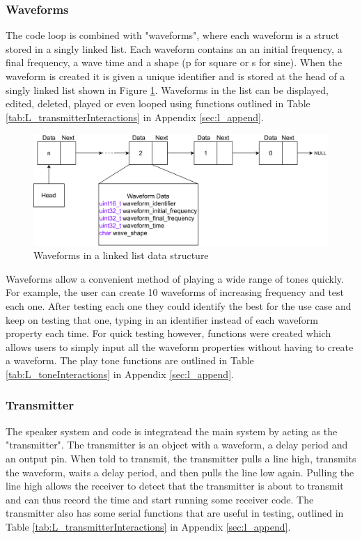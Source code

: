 \subsubsection{Waveforms}
The code loop is combined with "waveforms", where each waveform is a struct stored in a singly linked list. Each waveform contains an an initial frequency, a final frequency, a wave time and a shape (p for square or s for sine). When the waveform is created it is given a unique identifier and is stored at the head of a singly linked list shown in Figure \ref{fig:L_Waveforms}. Waveforms in the list can be displayed, edited, deleted, played or even looped using functions outlined in Table \ref{tab:L_transmitterInteractions} in Appendix \ref{sec:l_append}. \\

\begin{figure} [!htb]
	\hfill\includegraphics[width=\textwidth]{./images/speaker/L_Waveforms}\hspace{\fill}
	\caption{Waveforms in a linked list data structure}
	\label{fig:L_Waveforms}
\end{figure} 

Waveforms allow a convenient method of playing a wide range of tones quickly. For example, the user can create 10 waveforms of increasing frequency and test each one. After testing each one they could identify the best for the use case and keep on testing that one, typing in an identifier instead of each waveform property each time. For quick testing however, functions were created which allows users to simply input all the waveform properties without having to create a waveform. The play tone functions are outlined in Table \ref{tab:L_toneInteractions} in Appendix \ref{sec:l_append}. \\

\subsubsection{Transmitter}
The speaker system and code is integratead the main system by acting as the "transmitter". The transmitter is an object with a waveform, a delay period and an output pin. When told to transmit, the transmitter pulls a line high, transmits the waveform, waits a delay period, and then pulls the line low again. Pulling the line high allows the receiver to detect that the transmitter is about to transmit and can thus record the time and start running some receiver code. The transmitter also has some serial functions that are useful in testing, outlined in Table \ref{tab:L_transmitterInteractions} in Appendix \ref{sec:l_append}.
\pagebreak
